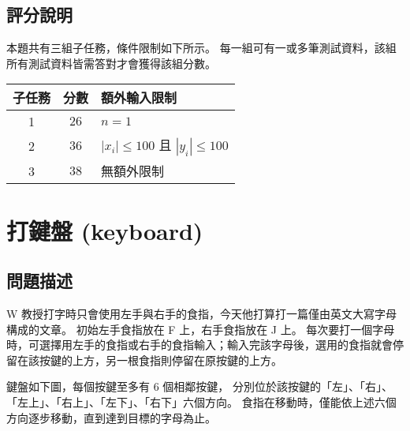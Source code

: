 \subsection{評分說明}

本題共有三組子任務，條件限制如下所示。
每一組可有一或多筆測試資料，該組所有測試資料皆需答對才會獲得該組分數。

\begin{longtable}[]{@{}ccl@{}}
\toprule
子任務 & 分數 & 額外輸入限制 \\
\midrule
\endhead
1 & \(26\) & \begin{math}n = 1\end{math} \\
2 & \(36\) & \begin{math}|x_i|\le100\end{math} 且
\begin{math}|y_i|\le100\end{math} \\
3 & \(38\) & 無額外限制 \\
\bottomrule
\end{longtable}

\section{打鍵盤 (keyboard)}

\subsection{問題描述}

W
教授打字時只會使用左手與右手的食指，今天他打算打一篇僅由英文大寫字母構成的文章。
初始左手食指放在 F 上，右手食指放在 J 上。
每次要打一個字母時，可選擇用左手的食指或右手的食指輸入；輸入完該字母後，選用的食指就會停留在該按鍵的上方，另一根食指則停留在原按鍵的上方。

鍵盤如下圖，每個按鍵至多有 \begin{math}6\end{math} 個相鄰按鍵，
分別位於該按鍵的「左」、「右」、「左上」、「右上」、「左下」、「右下」六個方向。
食指在移動時，僅能依上述六個方向逐步移動，直到達到目標的字母為止。

\begin{figure}[h]
\centering
{}
\end{figure}

